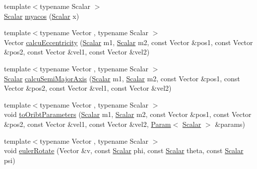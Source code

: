 \begin{DoxyCompactItemize}
\item 
{\footnotesize template$<$typename Scalar $>$ }\\\mbox{\hyperlink{create_kepler_8cpp_a8c2981f3f834be9448a6ab06c28748eb}{Scalar}} \mbox{\hyperlink{namespace_space_h_1_1_orbits_a678a54bbf3a8637d6437b4b8b4a39d97}{myacos}} (\mbox{\hyperlink{create_kepler_8cpp_a8c2981f3f834be9448a6ab06c28748eb}{Scalar}} x)
\item 
{\footnotesize template$<$typename Vector , typename Scalar $>$ }\\Vector \mbox{\hyperlink{namespace_space_h_1_1_orbits_a67c6c20142cd8a4bd9690741c61314da}{calcu\+Eccentricity}} (\mbox{\hyperlink{create_kepler_8cpp_a8c2981f3f834be9448a6ab06c28748eb}{Scalar}} m1, \mbox{\hyperlink{create_kepler_8cpp_a8c2981f3f834be9448a6ab06c28748eb}{Scalar}} m2, const Vector \&pos1, const Vector \&pos2, const Vector \&vel1, const Vector \&vel2)
\item 
{\footnotesize template$<$typename Vector , typename Scalar $>$ }\\\mbox{\hyperlink{create_kepler_8cpp_a8c2981f3f834be9448a6ab06c28748eb}{Scalar}} \mbox{\hyperlink{namespace_space_h_1_1_orbits_ad5dd14dac8365a426bc0ff7452318835}{calcu\+Semi\+Major\+Axis}} (\mbox{\hyperlink{create_kepler_8cpp_a8c2981f3f834be9448a6ab06c28748eb}{Scalar}} m1, \mbox{\hyperlink{create_kepler_8cpp_a8c2981f3f834be9448a6ab06c28748eb}{Scalar}} m2, const Vector \&pos1, const Vector \&pos2, const Vector \&vel1, const Vector \&vel2)
\item 
{\footnotesize template$<$typename Vector , typename Scalar $>$ }\\void \mbox{\hyperlink{namespace_space_h_1_1_orbits_a5e8b37a1237e17770907f5c2adbb53d6}{to\+Oribt\+Parameters}} (\mbox{\hyperlink{create_kepler_8cpp_a8c2981f3f834be9448a6ab06c28748eb}{Scalar}} m1, \mbox{\hyperlink{create_kepler_8cpp_a8c2981f3f834be9448a6ab06c28748eb}{Scalar}} m2, const Vector \&pos1, const Vector \&pos2, const Vector \&vel1, const Vector \&vel2, \mbox{\hyperlink{struct_space_h_1_1_orbits_1_1_param}{Param}}$<$ \mbox{\hyperlink{create_kepler_8cpp_a8c2981f3f834be9448a6ab06c28748eb}{Scalar}} $>$ \&params)
\item 
{\footnotesize template$<$typename Vector , typename Scalar $>$ }\\void \mbox{\hyperlink{namespace_space_h_1_1_orbits_ab06b7e85a786928255938378f9a97e26}{euler\+Rotate}} (Vector \&v, const \mbox{\hyperlink{create_kepler_8cpp_a8c2981f3f834be9448a6ab06c28748eb}{Scalar}} phi, const \mbox{\hyperlink{create_kepler_8cpp_a8c2981f3f834be9448a6ab06c28748eb}{Scalar}} theta, const \mbox{\hyperlink{create_kepler_8cpp_a8c2981f3f834be9448a6ab06c28748eb}{Scalar}} psi)

\end{DoxyCompactItemize}

